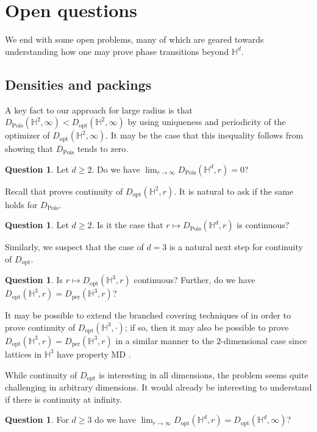 \documentclass[11pt]{amsart}
\theoremstyle{definition}
\newtheorem{question}[theorem]{Question}
\theoremstyle{remark}
\renewcommand{\H}{\mathbb{H}}
\newcommand{\opt}{\operatorname{opt}}
\newcommand{\per}{\operatorname{per}}
\newcommand{\Pois}{\operatorname{Pois}}
\newcommand{\Dopt}{D_{\opt}}
\newcommand{\Dper}{D_{\per}}
\newcommand{\DPois}{D_{\Pois}}
\begin{document}
\section{Open questions}\label{S:open}

We end with some open problems, many of which are geared towards understanding how one may prove phase transitions beyond $\H^d$.

\subsection{Densities and packings}
A key fact to our approach for large radius is that $\DPois(\H^2,\infty) < \Dopt(\H^2,\infty)$ by using uniqueness and periodicity of the optimizer of $\Dopt(\H^2,\infty)$.  It may be the case that this inequality follows from showing that $\DPois$ tends to zero. \begin{question}\label{q:dpois-infinity}
Let $d \geq 2$.  Do we have $\lim_{r \to \infty}\DPois(\H^d,r) = 0$?
\end{question}

Recall that \cite{bowen2003periodic} proves continuity of $\Dopt(\H^2,r)$.  It is natural to ask if the same holds for $\DPois$.  

\begin{question}
    Let $d \geq 2$.  Is it the case that $r \mapsto \DPois(\H^d,r)$ is continuous?  
\end{question}

Similarly, we suspect that the case of $d = 3$ is a natural next step for continuity of $\Dopt$.

\begin{question}
    Is $r \mapsto \Dopt(\H^3,r)$ continuous? Further, do we have $\Dopt(\H^3,r) = \Dper(\H^3,r)$?
\end{question}

It may be possible to extend the branched covering techniques of \cite{bowen2003existence} in order to prove continuity of $\Dopt(\H^3,\cdot)$; if so, then it may also be possible to prove $\Dopt(\H^3,r) = \Dper(\H^3,r)$ in a similar manner to the $2$-dimensional case since lattices in $\H^3$ have property MD \cite{bowen-tucker-2013}.

While continuity of   $\Dopt$ is interesting in all dimensions, the problem seems quite challenging in arbitrary dimensions.  It would already be interesting to understand if there is continuity at infinity. \begin{question}
    For $d \geq 3$ do we have $\lim_{r \to \infty} \Dopt(\H^d, r) = \Dopt(\H^d,\infty)$?
\end{question}
\end{document}
